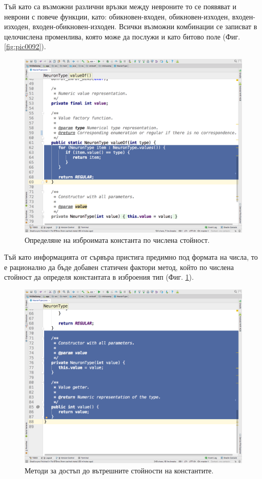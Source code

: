 \documentclass[book,14pt,oneside,openany]{memoir}
\begin{document}
Тъй като са възможни различни връзки между невроните то се появяват и неврони с повече функции, като: обикновен-входен, обикновен-изходен, входен-изходен, входен-обикновен-изходен. Всички възможни комбинации се записват в целочислена променлива, която може да послужи и като битово поле (Фиг. \ref{fig:pic0092}).

\begin{figure}[h]
  \centering
  \includegraphics[height=0.45\pdfpageheight]{pic0093}
  \caption{Определяне на изброимата константа по числена стойност.}
\label{fig:pic0093}
\end{figure}
\FloatBarrier

Тъй като информацията от сървъра пристига предимно под формата на числа, то е рационално да бъде добавен статичен фактори метод, който по числена стойност да определя константата в изброения тип (Фиг. \ref{fig:pic0093}).

\begin{figure}[h]
  \centering
  \includegraphics[height=0.45\pdfpageheight]{pic0094}
  \caption{Методи за достъп до вътрешните стойности на константите.}
\label{fig:pic0094}
\end{figure}
\FloatBarrier
\end{document}
